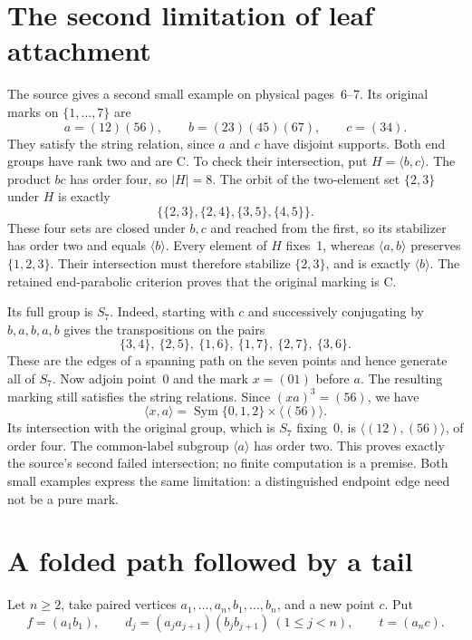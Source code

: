 \documentclass[a4paper,11pt]{article}
\newcommand{\Sym}{\operatorname{Sym}}\newcommand{\gen}[1]{\langle #1\rangle}
\begin{document}
\section{The second limitation of leaf attachment}
The source gives a second small example on physical pages~6--7. Its original
marks on $\{1,\ldots,7\}$ are
\[
 a=(12)(56),\qquad b=(23)(45)(67),\qquad c=(34).
\]
They satisfy the string relation, since $a$ and $c$ have disjoint supports.
Both end groups have rank two and are C. To check their intersection, put
$H=\gen{b,c}$. The product $bc$ has order four, so $|H|=8$.
The orbit of the two-element set $\{2,3\}$ under $H$ is exactly
\[
 \bigl\{\{2,3\},\{2,4\},\{3,5\},\{4,5\}\bigr\}.
\]
These four sets are closed under $b,c$ and reached from the first, so its
stabilizer has order two and equals $\gen{b}$. Every element of $H$ fixes~1,
whereas $\gen{a,b}$ preserves $\{1,2,3\}$. Their intersection must therefore
stabilize $\{2,3\}$, and is exactly $\gen{b}$. The retained end-parabolic
criterion proves that the original marking is C.

Its full group is $S_7$. Indeed, starting with $c$ and successively conjugating
by $b,a,b,a,b$ gives the transpositions on the pairs
\[
 \{3,4\},\ \{2,5\},\ \{1,6\},\ \{1,7\},\ \{2,7\},\ \{3,6\}.
\]
These are the edges of a spanning path on the seven points and hence generate
all of $S_7$. Now adjoin point~0 and the mark $x=(01)$ before $a$.
The resulting marking still satisfies the string relations. Since
$(xa)^3=(56)$, we have
\[
 \gen{x,a}=\Sym\{0,1,2\}\times\gen{(56)}.
\]
Its intersection with the original group, which is $S_7$ fixing~0, is
$\gen{(12),(56)}$, of order four. The common-label subgroup $\gen{a}$
has order two. This proves exactly the source's second failed intersection;
no finite computation is a premise. Both small examples express the same
limitation: a distinguished endpoint edge need not be a pure mark.

\section{A folded path followed by a tail}
Let $n\geq2$, take paired vertices $a_1,\ldots,a_n,b_1,\ldots,b_n$,
and a new point $c$. Put
\[
 f=(a_1b_1),\qquad
 d_j=(a_ja_{j+1})(b_jb_{j+1})\ (1\leq j<n),\qquad
 t=(a_nc).
\]
\end{document}
